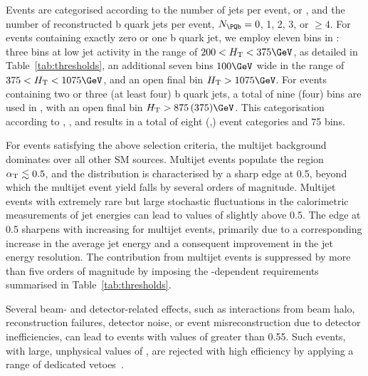 Events are categorised according to the number of jets per event,
\njetlow or \njethigh, and the number of reconstructed b quark jets
per event, $\nb = 0$, 1, 2, 3, or $\geq4$.  For events containing
exactly zero or one b quark jet, we employ eleven bins in \scalht:
three bins at low jet activity in the range of $200 < \scalht <
375\GeV$, as detailed in Table~\ref{tab:thresholds}, an additional
seven bins $100\GeV$ wide in the range of $375 < \scalht < 1075\GeV$,
and an open final bin $\scalht > 1075\GeV$.  For events containing two
or three (at least four) b quark jets, a total of nine (four) bins are
used in \scalht, with an open final bin $\scalht > 875\, (375)\GeV$.
This categorisation according to \njet, \nb, and \scalht results in a
total of eight (\njet,\nb) event categories and 75
bins.%

For events satisfying the above selection criteria, the multijet
background dominates over all other SM sources. Multijet events
populate the region $\alpha_\mathrm{T} \lesssim 0.5$, and the \alphat
distribution is characterised by a sharp edge at 0.5, beyond which the
multijet event yield falls by several orders of magnitude. Multijet
events with extremely rare but large stochastic fluctuations in the
calorimetric measurements of jet energies can lead to values of
\alphat slightly above 0.5. The edge at 0.5 sharpens with increasing
\scalht for multijet events, primarily due to a corresponding increase
in the average jet energy and a consequent improvement in the jet
energy resolution. The contribution from multijet events is suppressed
by more than five orders of magnitude by imposing the
\scalht-dependent \alphat requirements summarised in
Table~\ref{tab:thresholds}.

Several beam- and detector-related effects, such as interactions from
beam halo, reconstruction failures, detector noise, or event
misreconstruction due to detector inefficiencies, can lead to events
with values of \alphat greater than 0.55. Such events, with large,
unphysical values of \ptvecmiss, are rejected with high efficiency by
applying a range of dedicated vetoes~\cite{RA1Paper2012, cms-met}.

